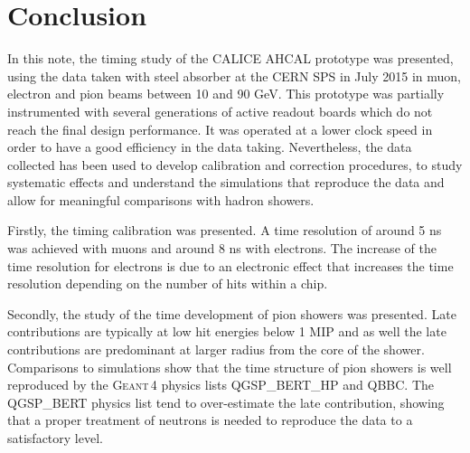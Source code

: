 \documentclass{JINST}
\newcommand\geant{\textsc{Geant\,4}\xspace}
\newcommand\ddhep{\textsc{DD4hep}\xspace}
\begin{document}

\section{Conclusion}

In this note, the timing study of the CALICE AHCAL prototype was presented, using the data taken with steel absorber at the CERN SPS in July 2015 in muon, electron and pion beams between 10 and 90 GeV. This prototype was partially instrumented with several generations of active readout boards which do not reach the final design performance. It was operated at a lower clock speed in order to have a good efficiency in the data taking. Nevertheless, the data collected has been used to develop calibration and correction procedures, to study systematic effects and understand the simulations that reproduce the data and allow for meaningful comparisons with hadron showers.

Firstly, the timing calibration was presented. A time resolution of around 5 ns was achieved with muons and around 8 ns with electrons. The increase of the time resolution for electrons is due to an electronic effect that increases the time resolution depending on the number of hits within a chip.

Secondly, the study of the time development of pion showers was presented. Late contributions are typically at low hit energies below 1 MIP and as well the late contributions are predominant at larger radius from the core of the shower. Comparisons to simulations show that the time structure of pion showers is well reproduced by the \geant physics lists QGSP\_BERT\_HP and QBBC. The QGSP\_BERT physics list tend to over-estimate the late contribution, showing that a proper treatment of neutrons is needed to reproduce the data to a satisfactory level.
\end{document}
